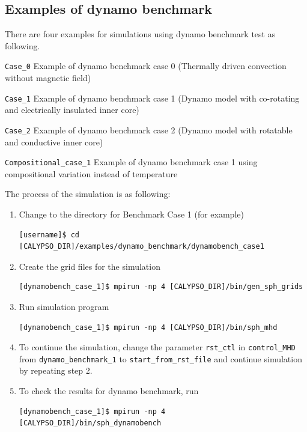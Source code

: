 \subsection{Examples of dynamo benchmark}
There are four examples for simulations using dynamo benchmark test as following.
%
\begin{description}
\item{\tt Case\_0} Example of dynamo benchmark case 0 (Thermally driven convection without magnetic field)
\item{\tt Case\_1} Example of dynamo benchmark case 1 (Dynamo model with co-rotating and electrically insulated inner core)
\item{\tt Case\_2} Example of dynamo benchmark case 2 (Dynamo model with rotatable and conductive inner core)
\item{\tt Compositional\_case\_1} Example of dynamo benchmark case 1 using compositional variation instead of temperature
\end{description}
%
The process of the simulation is as following:
%
\begin{enumerate}
\item Change to the directory for Benchmark Case 1 (for example) \\
{\small
\begin{verbatim}
[username]$ cd [CALYPSO_DIR]/examples/dynamo_benchmark/dynamobench_case1
\end{verbatim}
}

\item  Create the grid files for the simulation  \\
{\small
\begin{verbatim}
[dynamobench_case_1]$ mpirun -np 4 [CALYPSO_DIR]/bin/gen_sph_grids
\end{verbatim}
}

\item  Run simulation program
{\small
\begin{verbatim}
[dynamobench_case_1]$ mpirun -np 4 [CALYPSO_DIR]/bin/sph_mhd
\end{verbatim}
}

\item  To continue the simulation, change the parameter \verb|rst_ctl| in \verb|control_MHD| from \verb|dynamo_benchmark_1| to \verb|start_from_rst_file| and continue simulation by repeating step 2.

\item  To check the results for dynamo benchmark, run 
{\small
\begin{verbatim}
[dynamobench_case_1]$ mpirun -np 4 [CALYPSO_DIR]/bin/sph_dynamobench
\end{verbatim}
}
\end{enumerate}
%

